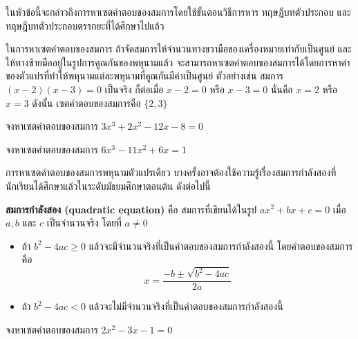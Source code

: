ในหัวข้อนี้จะกล่าวถึงการหาเซตคำตอบของสมการโดยใช้ขั้นตอนวิธีการหาร ทฤษฎีบทตัวประกอบ และทฤษฎีบทตัวประกอบตรรกยะที่ได้ศึกษาไปแล้ว

\begin{conceptbox}
	ในการหาเซตคำตอบของสมการ ถ้าจัดสมการให้จำนวนทางขวามือของเครื่องหมายเท่ากับเป็นศูนย์ และให้ทางซ้ายมืออยู่ในรูปการคูณกันของพหุนามแล้ว จะสามารถหาเซตคำตอบของสมการได้โดยการหาค่าของตัวแปรที่ทำให้พหุนามแต่ละพหุนามที่คูณกันมีค่าเป็นศูนย์ ตัวอย่างเช่น สมการ $(x-2)(x-3) = 0$ เป็นจริง ก็ต่อเมื่อ $x-2 = 0$ หรือ $x-3 = 0$ นั่นคือ $x = 2$ หรือ $x = 3$ ดังนั้น เซตคำตอบของสมการคือ $\{2, 3\}$
\end{conceptbox}

\vspace{1em}

\begin{examplebox}
	จงหาเซตคำตอบของสมการ $3x^3 + 2x^2 - 12x - 8 = 0$
\end{examplebox}
\solution
\newpage

\begin{examplebox}
	จงหาเซตคำตอบของสมการ $6x^3 - 11x^2 + 6x = 1$
\end{examplebox}
\solution
\newpage

การหาเซตคำตอบของสมการพหุนามตัวแปรเดียว บางครั้งอาจต้องใช้ความรู้เรื่องสมการกำลังสองที่นักเรียนได้ศึกษาแล้วในระดับมัธยมศึกษาตอนต้น ดังต่อไปนี้

\vspace{1em}

\begin{remarkbox}
	\textbf{สมการกำลังสอง (quadratic equation)} คือ สมการที่เขียนได้ในรูป $ax^2 + bx + c = 0$ เมื่อ $a, b$ และ $c$ เป็นจำนวนจริง โดยที่ $a \neq 0$
	\begin{itemize}
		\item 	ถ้า $b^2 - 4ac \geq 0$ แล้วจะมีจำนวนจริงที่เป็นคำตอบของสมการกำลังสองนี้ โดยคำตอบของสมการคือ 
		\begin{equation*}
			x = \frac{-b \pm \sqrt{b^2 - 4ac}}{2a}
		\end{equation*}
		\item 	ถ้า $b^2 - 4ac < 0$ แล้วจะไม่มีจำนวนจริงที่เป็นคำตอบของสมการกำลังสองนี้
	\end{itemize}
\end{remarkbox}

\vspace{1em}

\begin{examplebox}
	จงหาเซตคำตอบของสมการ $2x^2 - 3x - 1 = 0$
\end{examplebox}
\solution
\vspace{3cm}

